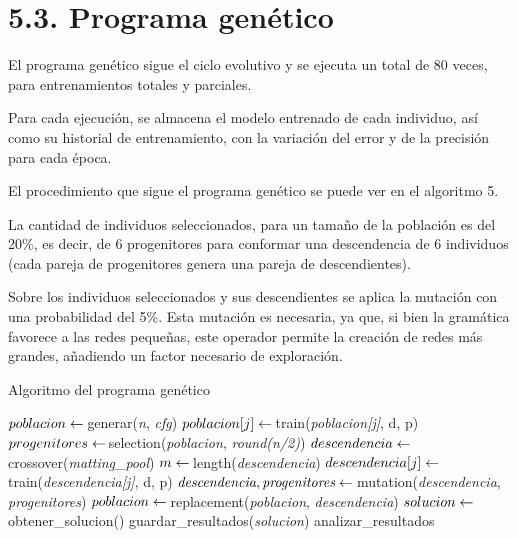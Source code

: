 \documentclass[spanish,a4paper,12pt,twoside]{report}
\begin{document}
  \section*{\Large 5.3. Programa genético}
  El programa genético sigue el ciclo evolutivo y se ejecuta un total de 80 veces, para entrenamientos totales y parciales. \par
  Para cada ejecución, se almacena el modelo entrenado de cada individuo, así como su historial de entrenamiento, con la variación del error y de la precisión para cada época. \par
  El procedimiento que sigue el programa genético se puede ver en el algoritmo 5. \par
  La cantidad de individuos seleccionados, para un tamaño de la población es del 20\%, es decir, de 6 progenitores para conformar una descendencia de 6 individuos (cada pareja de progenitores genera una pareja de descendientes). \par
  Sobre los individuos seleccionados y sus descendientes se aplica la mutación con una probabilidad del 5\%. Esta mutación es necesaria, ya que, si bien la gramática favorece a las redes pequeñas, este operador permite la creación de redes más grandes, añadiendo un factor necesario de exploración. \par
  \begin{algorithm}[H]
    \caption{Algoritmo del programa genético}\label{entren}
    \begin{algorithmic}[1]
       
          \State $poblacion \gets \thinspace $generar(\textit{n}, \textit{cfg})
            \State $poblacion[j] \gets \thinspace $train(\textit{poblacion[j]}, d, p)
          \EndFor
            \State $progenitores \gets \thinspace $selection(\textit{poblacion}, \textit{round(n/2)})
            \State $descendencia \gets \thinspace $crossover(\textit{matting\_pool})
            \State $m \gets \thinspace $length(\textit{descendencia})
              \State $descendencia[j] \gets \thinspace $train(\textit{descendencia[j]}, d, p)
            \EndFor
            \State $\textit{descendencia}, \textit{progenitores} \gets \thinspace $mutation(\textit{descendencia}, \textit{progenitores})
            \State $poblacion \gets \thinspace $replacement(\textit{poblacion}, \textit{descendencia})
          \EndWhile
          \State $solucion \gets \thinspace $obtener\_solucion()
          \State guardar\_resultados(\textit{solucion})
        \EndFor
        \State analizar\_resultados
      \EndFunction
    \end{algorithmic}
  \end{algorithm} \par
\end{document}
